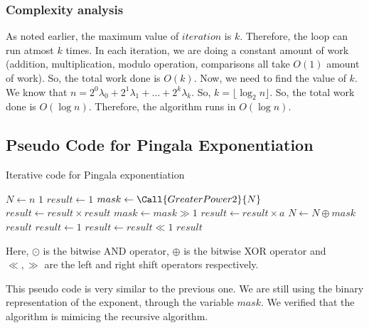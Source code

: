 \documentclass[12pt]{article}
\begin{document}
\subsubsection*{Complexity analysis}
As noted earlier, the maximum value of $iteration$ is $k$. Therefore, the loop can run atmost $k$ times. In each iteration, we are doing a constant amount of work (addition, multiplication, modulo operation, comparisons all take $O(1)$ amount of work). So, the total work done is $O(k)$. Now, we need to find the value of $k$. We know that $n = 2^0\lambda_0 + 2^1\lambda_1 + \ldots + 2^k\lambda_k$. So, $k = \lfloor \log_2 n \rfloor$. So, the total work done is $O(\log n)$. Therefore, the algorithm runs in $O(\log n)$.

\subsection*{Pseudo Code for Pingala Exponentiation}
\begin{algorithm}[H]
    \caption{Iterative code for Pingala exponentiation}
    \begin{algorithmic}[1]
            \State $N \gets n$
                \State \Return $1$
            \EndIf
            \State $result \gets 1$
            \State $mask \gets \Call{GreaterPower2}{N}$
                \State $result \gets result \times result$
                \State $mask \gets mask \gg 1$
                    \State $result \gets result \times a$
                    \State $N \gets N \oplus mask$
                \EndIf
            \EndWhile
            \State \Return $result$
        \EndFunction
            \State $result \gets 1$
            \Repeat
                \State $result \gets result \ll 1$
            \State \Return $result$
        \EndFunction
    \end{algorithmic}
\end{algorithm}
Here, $\odot$ is the bitwise AND operator, $\oplus$ is the bitwise XOR operator and $\ll, \gg$ are the left and right shift operators respectively.

This pseudo code is very similar to the previous one.
We are still using the binary representation of the exponent, through
the variable $mask$.
We verified that the algorithm is mimicing the recursive algorithm.
\end{document}
